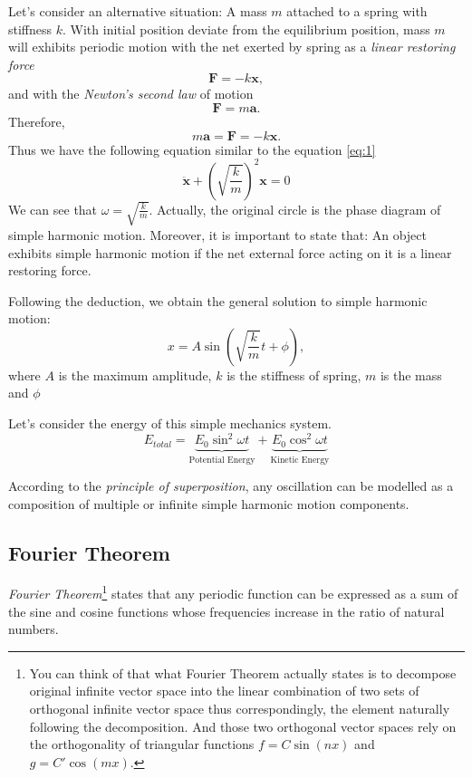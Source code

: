 \documentclass[UTF8]{book}
\begin{document}
Let's consider an alternative situation: A mass $m$ attached to a spring with stiffness $k$. 
With initial position deviate from the equilibrium position, mass $m$ will exhibits periodic 
motion with the net exerted by spring as a \emph{linear restoring force}
\[\mathbf{F}=-k\mathbf{x},\]
and with the \emph{Newton's second law} of motion
\[\mathbf{F}=m\mathbf{a}.\]
Therefore,
\[m\mathbf{a}=\mathbf{F}=-k\mathbf{x}.\]
Thus we have the following equation similar to the equation \eqref{eq:1}
\begin{equation}\label{eq:2}
\ddot{\mathbf{x}}+\left(\sqrt{\frac{k}{m}}\right)^2\mathbf{x}=0
\end{equation}
We can see that $\omega = \sqrt{\frac{k}{m}}$. Actually, the original circle is the phase diagram of simple harmonic motion. Moreover, it is important to state that: An object exhibits simple harmonic motion if the net external force acting on it is a linear restoring force.

Following the deduction, we obtain the general solution to simple harmonic motion:
\[x=A\sin \left(\sqrt{\frac{k}{m}}t+\phi \right),\]
where $A$ is the maximum amplitude, $k$ is the stiffness of spring, $m$ is the mass and $\phi $

Let's consider the energy of this simple mechanics system. 
\[
E_{total}=\underbrace{E_0\sin ^2\omega t}_\text{Potential Energy}+\underbrace{E_0\cos ^2\omega t}_\text{Kinetic Energy}
\]

According to the \emph{principle of superposition}, any oscillation can be modelled as a composition of multiple or infinite simple harmonic motion components.
\subsection{Fourier Theorem}
\emph{Fourier Theorem}\footnote{You can think of that what Fourier Theorem actually states is to decompose original infinite vector space into the linear combination of two sets of orthogonal infinite vector space thus correspondingly, the element naturally following the decomposition. And those two orthogonal vector spaces rely on the orthogonality of triangular functions $f=C\sin (nx)$ and $g=C'\cos (mx)$.} states that any periodic function can be expressed as a sum of the sine and cosine functions whose frequencies increase in the ratio of natural numbers.
\end{document}
